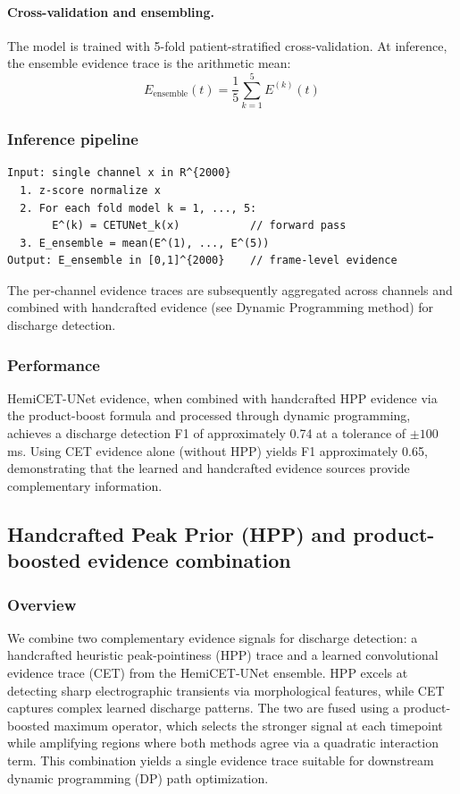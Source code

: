 \paragraph{Cross-validation and ensembling.}
The model is trained with 5-fold patient-stratified cross-validation. At inference, the ensemble evidence trace is the arithmetic mean:
\[ E_{\mathrm{ensemble}}(t) = \frac{1}{5} \sum_{k=1}^{5} E^{(k)}(t) \tag{8} \]

\subsubsection{Inference pipeline}

\begin{verbatim}
Input: single channel x in R^{2000}
  1. z-score normalize x
  2. For each fold model k = 1, ..., 5:
       E^(k) = CETUNet_k(x)           // forward pass
  3. E_ensemble = mean(E^(1), ..., E^(5))
Output: E_ensemble in [0,1]^{2000}    // frame-level evidence
\end{verbatim}

The per-channel evidence traces are subsequently aggregated across channels and combined with handcrafted evidence (see Dynamic Programming method) for discharge detection.

\subsubsection{Performance}

HemiCET-UNet evidence, when combined with handcrafted HPP evidence via the product-boost formula and processed through dynamic programming, achieves a discharge detection F1 of approximately 0.74 at a tolerance of $\pm 100$ ms. Using CET evidence alone (without HPP) yields F1 approximately 0.65, demonstrating that the learned and handcrafted evidence sources provide complementary information.

\subsection{Handcrafted Peak Prior (HPP) and product-boosted evidence combination}
\label{app:evidence_combination}

\subsubsection{Overview}

We combine two complementary evidence signals for discharge detection: a handcrafted heuristic peak-pointiness (HPP) trace and a learned convolutional evidence trace (CET) from the HemiCET-UNet ensemble. HPP excels at detecting sharp electrographic transients via morphological features, while CET captures complex learned discharge patterns. The two are fused using a product-boosted maximum operator, which selects the stronger signal at each timepoint while amplifying regions where both methods agree via a quadratic interaction term. This combination yields a single evidence trace suitable for downstream dynamic programming (DP) path optimization.

